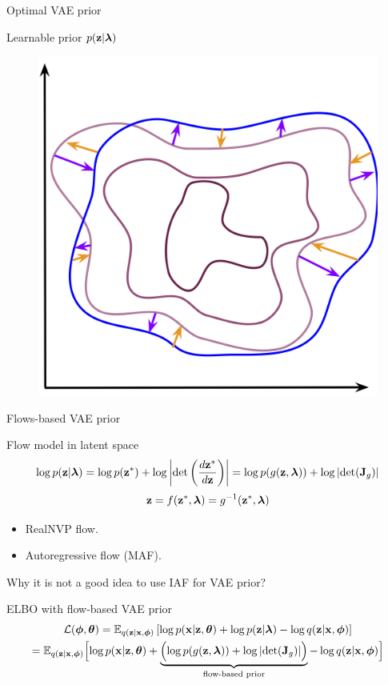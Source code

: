 \begin{frame}{Optimal VAE prior}
\begin{minipage}[t]{0.5\columnwidth}
\begin{block}{Learnable prior $p(\mathbf{z} | \boldsymbol{\lambda})$}
\begin{figure}[h]
				\includegraphics[width=0.8\linewidth]{figs/learnable_prior}
			\end{figure}
		\end{block}
	\end{minipage}
\end{frame}
\begin{frame}{Flows-based VAE prior}
	\begin{block}{Flow model in latent space}
		\vspace{-0.5cm}
		\[
			\log p(\mathbf{z} | \boldsymbol{\lambda}) = \log p(\mathbf{z}^*) + \log  \left | \det \left(\frac{d \mathbf{z}^*}{d\mathbf{z}}\right)\right| = \log p(g(\mathbf{z}, \boldsymbol{\lambda})) + \log \left | \det (\mathbf{J}_g)\right| 
		\]
		\[
			\mathbf{z} = f(\mathbf{z}^*, \boldsymbol{\lambda}) = g^{-1}(\mathbf{z}^*, \boldsymbol{\lambda})
		\]
	\end{block}
	\vspace{-0.3cm}
	\begin{itemize}
		\item RealNVP flow.
		\item Autoregressive flow (MAF).
	\end{itemize}
	Why it is not a good idea to use IAF for VAE prior?
	\begin{block}{ELBO with flow-based VAE prior}
		\vspace{-0.5cm}
		{\small
		\begin{multline*}
			\mathcal{L}(\boldsymbol{\phi}, \boldsymbol{\theta}) = \mathbb{E}_{q(\mathbf{z} | \mathbf{x}, \boldsymbol{\phi})} \left[ \log p(\mathbf{x} | \mathbf{z}, \boldsymbol{\theta}) +  \log p(\mathbf{z} | \boldsymbol{\lambda}) - \log q(\mathbf{z} | \mathbf{x}, \boldsymbol{\phi}) \right] \\
				= \mathbb{E}_{q(\mathbf{z} | \mathbf{x}, \boldsymbol{\phi})} \Bigl[ \log p(\mathbf{x} | \mathbf{z}, \boldsymbol{\theta}) + \underbrace{ \Bigl( \log p(g(\mathbf{z}, \boldsymbol{\lambda})) + \log \left| \det (\mathbf{J}_g) \right| \Bigr) }_{\text{flow-based prior}} - \log q(\mathbf{z} | \mathbf{x}, \boldsymbol{\phi}) \Bigr] 
		\end{multline*}
		}
	\end{block}
\end{frame}
